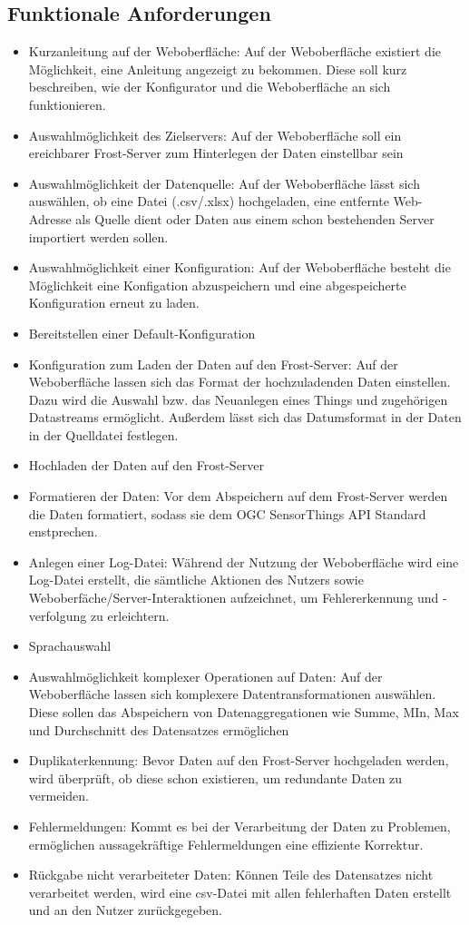 \documentclass[12 pt]{article}
\begin{document}
\subsection{Funktionale Anforderungen}

\begin{itemize}
\item Kurzanleitung auf der Weboberfläche: Auf der Weboberfläche existiert die Möglichkeit, eine Anleitung angezeigt zu bekommen. Diese soll kurz beschreiben, wie der Konfigurator und die Weboberfläche an sich funktionieren.
\item Auswahlmöglichkeit des Zielservers: Auf der Weboberfläche soll ein ereichbarer Frost-Server zum Hinterlegen der Daten einstellbar sein
\item Auswahlmöglichkeit der Datenquelle: Auf der Weboberfläche lässt sich auswählen, ob eine Datei (.csv/.xlsx) hochgeladen, eine entfernte Web-Adresse als Quelle dient oder Daten aus einem schon bestehenden Server importiert werden sollen.
\item Auswahlmöglichkeit einer Konfiguration: Auf der Weboberfläche besteht die Möglichkeit eine Konfigation abzuspeichern und eine abgespeicherte Konfiguration erneut zu laden.
\item Bereitstellen einer Default-Konfiguration
\item Konfiguration zum Laden der Daten auf den Frost-Server: Auf der Weboberfläche lassen sich das Format der hochzuladenden Daten einstellen. Dazu wird die Auswahl bzw. das Neuanlegen eines Things und zugehörigen Datastreams ermöglicht. Außerdem lässt sich das Datumsformat in der Daten in der Quelldatei festlegen.
\item Hochladen der Daten auf den Frost-Server
\item Formatieren der Daten: Vor dem Abspeichern auf dem Frost-Server werden die Daten formatiert, sodass sie dem OGC SensorThings API Standard enstprechen.
\item Anlegen einer Log-Datei: Während der Nutzung der Weboberfläche wird eine Log-Datei erstellt, die sämtliche Aktionen des Nutzers sowie Weboberfäche/Server-Interaktionen aufzeichnet, um Fehlererkennung und -verfolgung zu erleichtern.
\item Sprachauswahl
\item Auswahlmöglichkeit komplexer Operationen auf Daten: Auf der Weboberfläche lassen sich komplexere Datentransformationen auswählen. Diese sollen das Abspeichern von Datenaggregationen wie Summe, MIn, Max und Durchschnitt des Datensatzes ermöglichen
\item Duplikaterkennung: Bevor Daten auf den Frost-Server hochgeladen werden, wird überprüft, ob diese schon existieren, um redundante Daten zu vermeiden.
\item Fehlermeldungen: Kommt es bei der Verarbeitung der Daten zu Problemen, ermöglichen aussagekräftige Fehlermeldungen eine effiziente Korrektur.
\item Rückgabe nicht verarbeiteter Daten: Können Teile des Datensatzes nicht verarbeitet werden, wird eine csv-Datei mit allen fehlerhaften Daten erstellt und an den Nutzer zurückgegeben.
\end{itemize}
\end{document}
